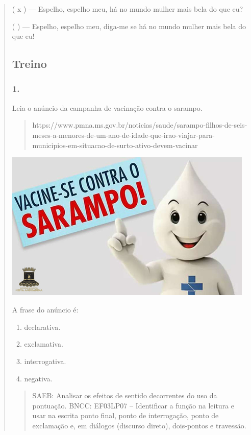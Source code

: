 \begin{quote}
\begin{iteize}
( x ) --- Espelho, espelho meu, há no mundo mulher mais bela do que eu?

( ) --- Espelho, espelho meu, diga-me se há no mundo mulher mais bela do
que eu!

\subsection{Treino}\label{treino-2}

\subsubsection{1.}\label{section-36}

Leia o anúncio da campanha de vacinação contra o sarampo.

\begin{quote}
https://www.pmna.ms.gov.br/noticias/saude/sarampo-filhos-de-seis-meses-a-menores-de-um-ano-de-idade-que-irao-viajar-para-municipios-em-situacao-de-surto-ativo-devem-vacinar
\end{quote}

\includegraphics[width=4.68681in,height=2.81736in]{media/image7.jpeg}

A frase do anúncio é:

\begin{enumerate}
\def\labelenumi{(\Alph{enumi})}
\item
  declarativa.
\item
  exclamativa.
\item
  interrogativa.
\item
  negativa.
\end{enumerate}

\begin{quote}
SAEB: Analisar os efeitos de sentido decorrentes do uso da pontuação.
BNCC: EF03LP07 -- Identificar a função na leitura e usar na escrita ponto
final, ponto de interrogação, ponto de exclamação e, em diálogos
(discurso direto), dois-pontos e travessão.


\end{quote}
\end{iteize}
\end{quote}
